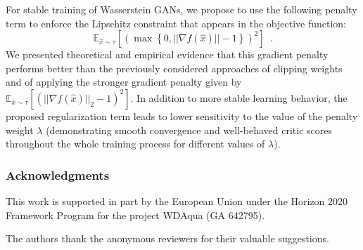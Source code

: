 \documentclass{article} %
\newcommand{\dl}[1]{\textcolor{purple}{#1}}
\begin{document}
For stable training of Wasserstein GANs, we propose to use the following penalty term to enforce the Lipschitz constraint that appears in the objective function:  $$\mathbb{E}_{\hat x \sim \tau}[\left( \max \left \{ 0 , ||\nabla f (\hat x)|| -1 \right \}\right)^2]\enspace .$$  We presented theoretical and empirical evidence
that this gradient penalty performs better than the previously considered approaches of clipping weights and of applying the stronger gradient penalty given by $\mathbb{E}_{\hat x \sim \tau}[(||\nabla f(\hat x)||_2 - 1)^2]$. 
In addition to more stable learning behavior, the proposed regularization term leads to lower sensitivity to the value of the penalty weight $\lambda$ (demonstrating smooth convergence and well-behaved critic scores throughout the whole training process for different values of $\lambda$).

\subsubsection*{Acknowledgments}

This work is supported in part by the European Union under the Horizon 2020 Framework Program for the project WDAqua (GA 642795). 

The authors thank the anonymous reviewers for their valuable suggestions.





\end{document}
